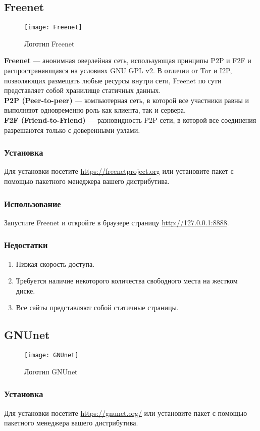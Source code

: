 \subsection{Freenet}
\begin{wrapfigure}[9]{r}{0.25\linewidth}
\texttt{[image: Freenet]}
\caption{Логотип Freenet}
\end{wrapfigure}
\textbf{Freenet} --- анонимная оверлейная сеть, использующая принципы P2P и F2F и распространяющаяся на условиях GNU GPL v2\cite{freenet_license}. В отличии от Tor и I2P, позволяющих размещать любые ресурсы внутри сети, Freenet по сути представляет собой хранилище статичных данных.\\
\textbf{P2P (Peer-to-peer)} --- компьютерная сеть, в которой все участники равны и выполняют одновременно роль как клиента, так и сервера.\\
\textbf{F2F (Friend-to-Friend)} --- разновидность P2P-сети, в которой все соединения разрешаются только с доверенными узлами.
\subsubsection{Установка}
Для установки посетите \url{https://freenetproject.org} или установите пакет с помощью пакетного менеджера вашего дистрибутива.
\subsubsection{Использование}
Запустите Freenet и откройте в браузере страницу \url{http://127.0.0.1:8888}.
\subsubsection{Недостатки}
\begin{enumerate}
\item Низкая скорость доступа.
\item Требуется наличие некоторого количества свободного места на жестком диске.
\item Все сайты представляют собой статичные страницы.
\end{enumerate}
\subsection{GNUnet}
\begin{wrapfigure}[9]{r}{0.25\linewidth}
\texttt{[image: GNUnet]}
\caption{Логотип GNUnet}
\end{wrapfigure}
\subsubsection{Установка}
Для установки посетите \url{https://gnunet.org/} или установите пакет с помощью пакетного менеджера вашего дистрибутива.

